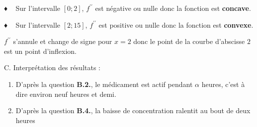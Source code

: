 \begin{corrige}
\begin{enumerate}
          \par
          ♦ ~ Sur l'intervalle $\left[0; 2\right]$, $f^{\prime\prime}$ est négative ou nulle donc la fonction est \textbf{concave}.
          \par
          ♦ ~ Sur l'intervalle $\left[2; 15\right]$, $f^{\prime\prime}$ est positive ou nulle donc la fonction est \textbf{convexe}.
          \par
          $f^{\prime\prime}$ s'annule et change de signe pour $x=2$ donc le point de la courbe d'abscisse $2$ est un point d'inflexion.
     \end{enumerate}
     \begin{h3}C. Interprétation des résultats :\end{h3}
     \begin{enumerate}
          \item
          D'après la question \textbf{B.2.}, le médicament est actif pendant $\alpha $ heures, c'est à dire environ neuf heures et demi.
          \item
          D'après la question \textbf{B.4.}, la baisse de concentration ralentit au bout de deux heures
     \end{enumerate}
\end{corrige}
